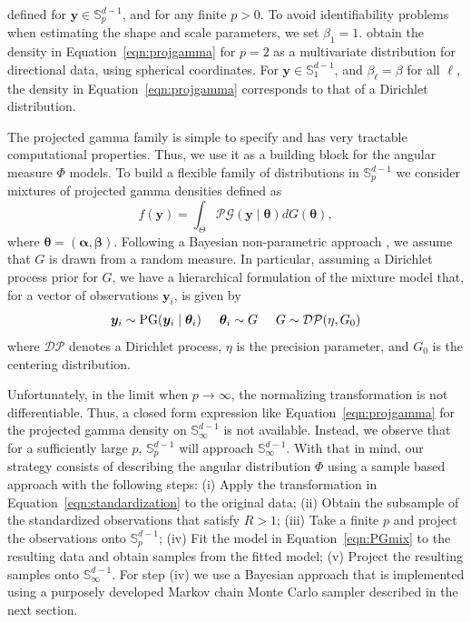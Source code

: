   defined for $\bm{y}\in {\mathbb S}_p^{d-1}$, and for any finite $p>0$. To avoid identifiability 
  problems when estimating the shape and scale parameters, we set $\beta_1 = 1$.
  \cite{nunez2019} obtain the density in Equation~\eqref{eqn:projgamma}
  for $p=2$ as a multivariate distribution for directional data, using spherical coordinates.  
  For $\bm{ y}\in {\mathbb S}_1^{d-1}$, and $\beta_{\ell} = \beta$ for all $\ell$, the density in
  Equation~\eqref{eqn:projgamma} corresponds to that of a Dirichlet distribution.
  
  
The projected gamma family is simple to specify and has very tractable 
  computational properties. Thus, we use it as a building block for the 
  angular measure $\Phi$ models. To build a flexible family of distributions 
  in ${\mathbb S}_p^{d-1}$ we consider mixtures of projected gamma densities 
  defined as
  \begin{equation} \label{eqn:PGmix}     
     f(\bm{y}) = \int_\Theta \mathcal{PG}(\bm{y}\mid \bm{\theta}) dG(\bm{\theta}), 
  \end{equation} 
where $\bm{\theta} = (\bm{\alpha}, \bm{\beta})$. Following a Bayesian 
  non-parametric approach \citep{Ferguson74,Antoniak1974,muller2015},
  we assume that $G$ 
  is drawn from a random measure. In particular, assuming a Dirichlet process 
  prior for $G$, we have a hierarchical formulation of the mixture model that, 
  for a vector of observations $\bm{y}_i$, is given by
  \begin{equation}\label{eqn:dppg}
    \bm{y}_i \sim \text{PG}(\bm{y}_i\mid \bm{\theta}_i)\hspace{.5cm}
    \bm{\theta}_i \sim G\hspace{.5cm}
    G \sim \mathcal{DP}(\eta, G_0)
  \end{equation}
  where $\mathcal{DP}$ denotes a Dirichlet process, $\eta$ is the precision 
  parameter, and $G_0$ is the centering distribution. 
  
Unfortunately, in the limit when $p\rightarrow \infty$, the normalizing 
  transformation is not differentiable. Thus, a closed form expression 
  like Equation~\eqref{eqn:projgamma} for the projected gamma density on ${\mathbb S}_\infty^{d-1}$ is not 
  available. Instead, we observe that for a sufficiently large $p$, $\mathbb{S}_p^{d-1}$ will approach
  $\mathbb{S}_{\infty}^{d-1}$.  With that in mind, our strategy consists of describing the angular
  distribution $\Phi$ using a sample based approach with the following steps: (i) Apply the 
  transformation in Equation~\eqref{eqn:standardization} to the original data; (ii) Obtain the 
  subsample of the standardized observations that satisfy $R>1$; (iii) Take a finite $p$ and 
  project the observations onto ${\mathbb S}_p^{d-1}$; 
  (iv) Fit the model in Equation~\eqref{eqn:PGmix} to the resulting 
  data and obtain samples from the fitted model; 
  (v) Project the resulting samples onto ${\mathbb S}_\infty^{d-1}$.
  For step (iv) we use a Bayesian approach that is implemented using a purposely 
  developed Markov chain Monte Carlo sampler described in the next section.

